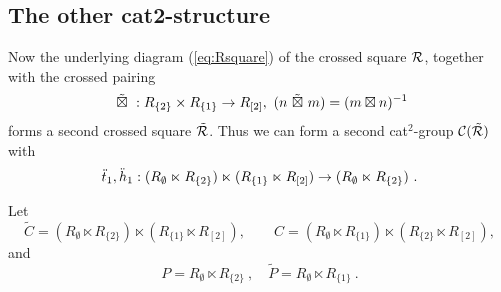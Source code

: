 \vspace*{5mm} 
\subsection{The other cat2-structure}

Now the underlying diagram (\ref{eq:Rsquare}) of the crossed square $\mathcal{R}$, 
together with the crossed pairing 
$$
\btt : R_{\{2\}} \times R_{\{1\}} \to R_{[2]}, \ 
               (n \btt m) = (m \bt n)^{-1}
$$
forms a second crossed square $\tilde{\mathcal{R}}$. 
Thus we can form a second cat$^2$-group $\mathcal{C}(\tilde{\mathcal{R}})$ with 
$$
\ddot{t}_1, \ddot{h}_1 : (R_{\emptyset} \ltimes R_{\{2\}}) \ltimes (R_{\{1\}} 
            \ltimes R_{[2]}) \to (R_{\emptyset} \ltimes R_{\{2\}})~.
$$

Let
$$
\tilde{C} = (R_{\emptyset} \ltimes R_{\{2\}}) \ltimes (R_{\{1\}} 
       \ltimes R_{[2]}), \qquad
C = (R_{\emptyset} \ltimes R_{\{1\}}) \ltimes (R_{\{2\}} \ltimes R_{[2]}),
$$
and
$$
P  = R_{\emptyset} \ltimes R_{\{2\}}~, \quad 
\tilde{P} = R_{\emptyset} \ltimes R_{\{1\}}~.
$$


